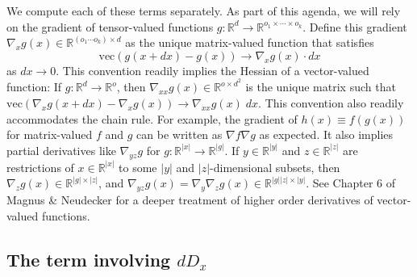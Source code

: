 \documentclass{article}
\begin{document}
We compute each of these terms separately. As part of this agenda, we will rely
on the gradient of tensor-valued functions $g:\mathbb{R}^d \to \mathbb{R}^{o_1
        \times \cdots \times o_k}$. Define this gradient $\nabla_x g(x)\in
    \mathbb{R}^{(o_1 \cdots o_k) \times d}$ as the unique matrix-valued function
that satisfies \begin{equation}
    \mathrm{vec}
    \left(g(x+dx) - g(x)\right) \to \nabla_x g(x) \cdot dx
\end{equation}
as $dx \to 0$.  This convention readily implies the Hessian of a vector-valued function: If
$g:\mathbb{R}^d \to \mathbb{R}^o$, then $\nabla_{xx} g(x) \in
    \mathbb{R}^{o\times d^2}$ is the unique matrix such that $\mathrm{vec}
    \left(\nabla_x g(x+dx) - \nabla_x g(x)\right) \to \nabla_{xx} g(x) \; dx$. This
convention also readily accommodates the chain rule. For example, the gradient
of $h(x) \equiv f(g(x))$ for matrix-valued $f$ and $g$ can be written as $\nabla
    f \nabla g$ as expected. It also implies partial derivatives like $\nabla_{yz}
    g$ for $g:\mathbb{R}^{|x|} \to \mathbb{R}^{|g|}$.  If $y\in \mathbb{R}^{|y|}$
and $z\in \mathbb{R}^{|z|}$ are restrictions of $x \in \mathbb{R}^{|x|}$ to some
$|y|$ and $|z|$-dimensional subsets, then $\nabla_z g(x) \in \mathbb{R}^{|g|
        \times |z|}$, and $\nabla_{yz} g(x) = \nabla_y \nabla_z g(x) \in
    \mathbb{R}^{|g||z| \times |y|}$. See Chapter 6 of Magnus \& Neudecker
\cite{magnus-neudecker} for a deeper treatment of higher order derivatives of
vector-valued functions.

\subsection{The term involving $dD_x$}
\end{document}

